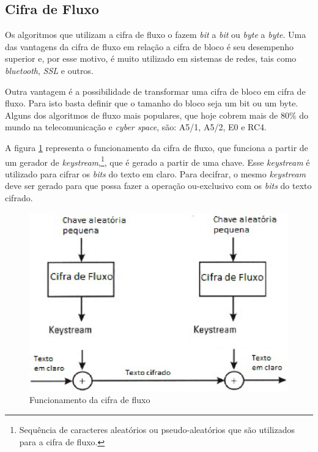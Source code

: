 \subsection{Cifra de Fluxo}
\label{stream-cipher}

Os algoritmos que utilizam a cifra de fluxo o fazem \textit{bit} a \textit{bit} ou \textit{byte} a \textit{byte}. Uma das vantagens da cifra de fluxo em relação a cifra de bloco é seu desempenho superior e, por esse motivo, é muito utilizado em sistemas de redes, tais como \textit{bluetooth}, \textit{SSL} e outros. 

Outra vantagem é a possibilidade de transformar uma cifra de bloco em cifra de fluxo. Para isto basta definir que o tamanho do bloco seja um bit ou um byte. Alguns dos algoritmos de fluxo mais populares, que hoje cobrem mais de 80$\%$ do mundo na telecomunicação e \textit{cyber space}, são: A5/1, A5/2, E0 e RC4. ~\cite{majid-mohd}

A figura \ref{stream-cipher-functioning} representa o  funcionamento da cifra de fluxo, que funciona a partir de um gerador de \textit{keystream},\footnote{Sequência de caracteres aleatórios ou pseudo-aleatórios que são utilizados para a cifra de fluxo.}, que é gerado a partir de uma chave. Esse \textit{keystream} é utilizado para cifrar os \textit{bits}  do texto em claro. Para decifrar, o mesmo \textit{keystream} deve ser gerado para que possa fazer a operação ou-exclusivo com os \textit{bits} do texto cifrado.

\begin{figure}[h]
\centering
\includegraphics[keepaspectratio=true,scale=0.9]
    {figuras/stream_cipher.eps}
    \caption[Funcionamento da cifra de fluxo]{Funcionamento da cifra de fluxo\protect\footnotemark} 
    \label{stream-cipher-functioning}
\end{figure}

